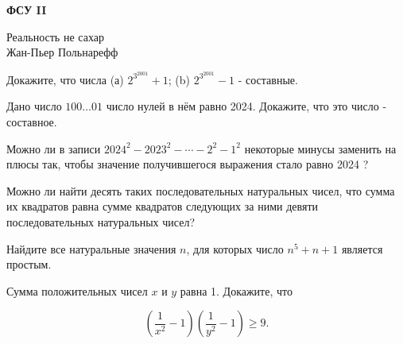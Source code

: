 \centerline{\bf \Huge ФСУ II}

\begin{flushright}
        \scriptsize{Реальность не сахар\\Жан-Пьер Польнарефф}
\end{flushright}

Докажите, что числа (а) $2^{3^{2001}}+1$; (b) $2^{3^{2001}}-1$ - составные.

Дано число $100 \ldots 01$ число нулей в нём равно 2024. Докажите, что это число - составное.

Можно ли в записи $2024^2-2023^2-\cdots-2^2-1^2$ некоторые минусы заменить на плюсы так, чтобы значение получившегося выражения стало равно 2024 ?

Можно ли найти десять таких последовательных натуральных чисел, что сумма их квадратов равна сумме квадратов следующих за ними девяти последовательных натуральных чисел?

Найдите все натуральные значения $n$, для которых число $n^5+n+1$ является простым.

Сумма положительных чисел $x$ и $y$ равна 1. Докажите, что

$$
\left(\frac{1}{x^2}-1\right)\left(\frac{1}{y^2}-1\right) \geq 9 .
$$